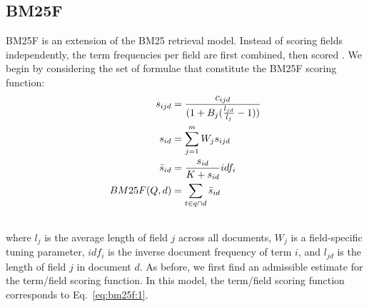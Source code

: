 \documentclass{sig-alternate}
\begin{document}
\subsection{BM25F}
BM25F is an extension of the BM25 retrieval model. Instead of scoring fields independently, the
term frequencies per field are first combined, then scored \cite{Robertson-cikm-2004}.
We begin by considering the set of formulae that constitute the BM25F scoring function:
\begin{align}
s_{ijd} 	&= \frac{c_{ijd}}{(1 + B_{j}(\frac{l_{jd}}{l_{j}} - 1))} \label{eq:bm25f:1}\\
s_{id}	 		&= \sum_{j=1}^{m} W_{j} s_{ijd}  \label{eq:bm25f:2}\\ 
{\bar s}_{id}		&= \frac{s_{id}}{K + s_{id}} idf_{i}  \label{eq:bm25f:4}\\
BM25F(Q,d) 			&= \sum_{t \in q \cap d} {\bar s}_{id} \label{eq:bm25f:3}\\ \notag
\end{align}
where $l_{j}$ is the average length of field $j$ across all documents, $W_{j}$ is a field-specific tuning parameter, $idf_{i}$ is the inverse document frequency of term $i$, and $l_{jd}$ is the length of field $j$ in document $d$. As before, we first find an admissible estimate for the term/field scoring function. In this model, the term/field scoring function corresponds to Eq.~\ref{eq:bm25f:1}.
\end{document}
